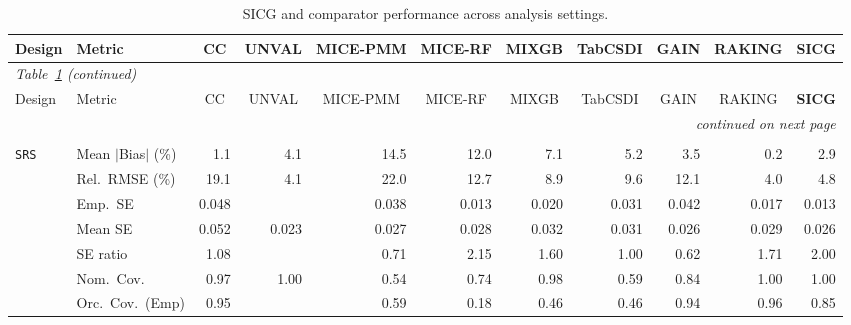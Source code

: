 \begin{landscape}
\footnotesize\setlength{\tabcolsep}{3.5pt}
\begin{longtable}{llrrrrrrrrr}
\caption{SICG and comparator performance across analysis settings.}
\label{tab:appc_vccc_LM} \\
\toprule
Design & Metric & \multicolumn{1}{c}{CC} & \multicolumn{1}{c}{UNVAL} & \multicolumn{1}{c}{MICE-PMM} & \multicolumn{1}{c}{MICE-RF} & \multicolumn{1}{c}{MIXGB} & \multicolumn{1}{c}{TabCSDI} & \multicolumn{1}{c}{GAIN} & \multicolumn{1}{c}{RAKING} & \multicolumn{1}{c}{\textbf{SICG}} \\
\midrule \endfirsthead
\multicolumn{11}{l}{\footnotesize\itshape Table~\ref{tab:appc_vccc_LM} (continued)} \\
\toprule
Design & Metric & \multicolumn{1}{c}{CC} & \multicolumn{1}{c}{UNVAL} & \multicolumn{1}{c}{MICE-PMM} & \multicolumn{1}{c}{MICE-RF} & \multicolumn{1}{c}{MIXGB} & \multicolumn{1}{c}{TabCSDI} & \multicolumn{1}{c}{GAIN} & \multicolumn{1}{c}{RAKING} & \multicolumn{1}{c}{\textbf{SICG}} \\
\midrule \endhead
\midrule \multicolumn{11}{r}{\footnotesize\itshape continued on next page} \\
\endfoot
\bottomrule \endlastfoot
\multicolumn{11}{l}{\textbf{Continuous Phase-Two Covariates}} \\
\addlinespace[2pt]
\quad \texttt{SRS} & Mean $|$Bias$|$ (\%) & \cellcolor{ranktwo}1.1 & 4.1 & 14.5 & 12.0 & 7.1 & 5.2 & 3.5 & \cellcolor{rankone}0.2 & \cellcolor{rankthree}2.9 \\
 & Rel.\ RMSE (\%) & 19.1 & \cellcolor{ranktwo}4.1 & 22.0 & 12.7 & 8.9 & 9.6 & 12.1 & \cellcolor{rankone}4.0 & \cellcolor{rankthree}4.8 \\
 & Emp.\ SE & 0.048 &  & 0.038 & 0.013 & 0.020 & 0.031 & 0.042 & 0.017 & 0.013 \\
 & Mean SE & 0.052 & 0.023 & 0.027 & 0.028 & 0.032 & 0.031 & 0.026 & 0.029 & 0.026 \\
 & SE ratio & \cellcolor{ranktwo}1.08 &  & \cellcolor{rankthree}0.71 & 2.15 & 1.60 & \cellcolor{rankone}1.00 & 0.62 & 1.71 & 2.00 \\
 & Nom.\ Cov. & \cellcolor{rankone}0.97 & \cellcolor{rankthree}1.00 & 0.54 & 0.74 & \cellcolor{ranktwo}0.98 & 0.59 & 0.84 & \cellcolor{rankthree}1.00 & \cellcolor{rankthree}1.00 \\
 & Orc.\ Cov.\ (Emp) & \cellcolor{rankone}0.95 &  & 0.59 & 0.18 & 0.46 & 0.46 & \cellcolor{ranktwo}0.94 & \cellcolor{ranktwo}0.96 & \cellcolor{rankthree}0.85 \\

\end{longtable}
\end{landscape}
